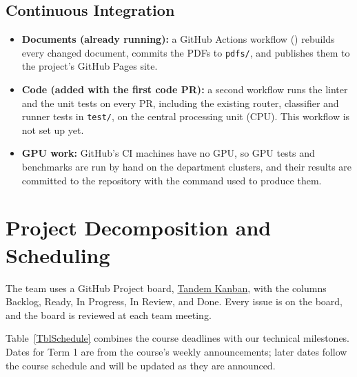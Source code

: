 \documentclass{article}
\begin{document}
\subsection{Continuous Integration}

\begin{itemize}
  \item \textbf{Documents (already running):} a GitHub Actions workflow
  () rebuilds every changed
  document, commits the PDFs to \texttt{pdfs/}, and publishes them to the
  project's GitHub Pages site.
  \item \textbf{Code (added with the first code PR):} a second workflow
  runs the linter and the unit tests on every PR, including the existing
  router, classifier and runner tests in \texttt{test/}, on the central
  processing unit (CPU). This workflow is not set up yet.
  \item \textbf{GPU work:} GitHub's CI machines have no GPU, so GPU tests
  and benchmarks are run by hand on the department clusters, and their
  results are committed to the repository with the command used to produce
  them.
\end{itemize}

\section{Project Decomposition and Scheduling}

The team uses a GitHub Project board,
\href{https://github.com/users/jjustin-k/projects/11}{Tandem Kanban}, with
the columns Backlog, Ready, In Progress, In Review, and Done. Every issue is
on the board, and the board is reviewed at each team meeting.

Table~\ref{TblSchedule} combines the course deadlines with our technical
milestones. Dates for Term 1 are from the course's weekly announcements;
later dates follow the course schedule and will be updated as they are
announced.
\end{document}
